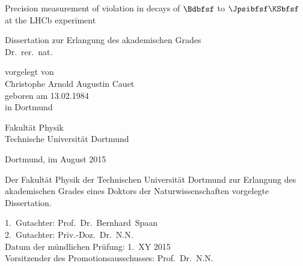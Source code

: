 
\begin{titlepage}

\vspace*{20ex}

{%
\Huge \sffamily \bfseries 
\begin{center}
  Precision measurement of \CPbfsf violation in decays of $\Bdbfsf$ to $\Jpsibfsf\KSbfsf$ at the LHCb experiment
\end{center} 
}%

\begin{german}
{%
\LARGE \sffamily %
\begin{center}
  Dissertation zur Erlangung des akademischen Grades\\
  Dr.~rer.~nat.
\end{center}
}

\vspace{5ex}

{%
\Large \rmfamily
\begin{center}
  vorgelegt von \\ [0.8ex]
  Christophe Arnold Augustin Cauet \\ [0.8ex]
  geboren am 13.02.1984 \\
  in Dortmund
\end{center}
}

\vspace{5ex}

{%
\Large \rmfamily
\begin{center}
  Fakultät Physik\\
  Technische Universität Dortmund
\end{center}
}

\vspace{4ex}

{%
\Large \rmfamily
\begin{center}
  Dortmund, im August 2015
\end{center}
}

\clearpage
\thispagestyle{empty}
\vspace*{\fill}
\noindent Der Fakultät Physik der Technischen Universität Dortmund zur Erlangung
des akademischen Grades eines Doktors der Naturwissenschaften vorgelegte
Dissertation.\\

\parbox{0.90\textwidth}{
  1.~Gutachter: Prof.~Dr.~Bernhard~Spaan \\
  2.~Gutachter: Priv.-Doz.~Dr.~N.N.\\
  Datum der mündlichen Prüfung: 1.~XY 2015\\
  Vorsitzender des Promotionsausschusses: Prof.~Dr.~N.N.
}
\end{german}
\end{titlepage}

